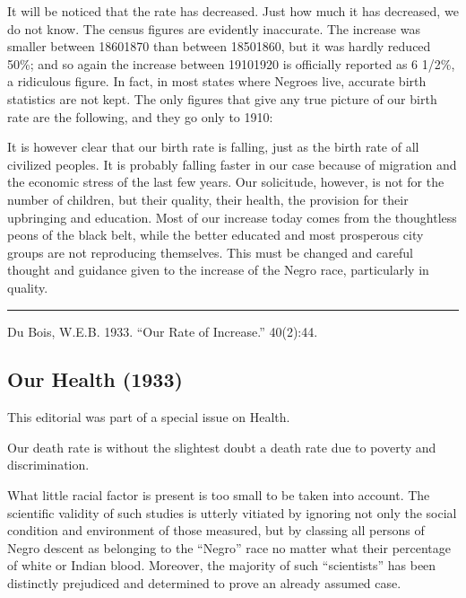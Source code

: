 \documentclass[letterpaper,10pt,english]{jupyterBook}
\begin{document}
\sphinxAtStartPar
It will be noticed that the rate has decreased. Just how much it has decreased, we do not know. The census figures are evidently inaccurate. The increase was smaller between 1860\sphinxhyphen{}1870 than between 1850\sphinxhyphen{}1860, but it was hardly reduced 50\%; and so again the increase between 1910\sphinxhyphen{}1920 is officially reported as 6 1/2\%, a ridiculous figure. In fact, in most states where Negroes live, accurate birth statistics are not kept. The only figures that give any true picture of our birth rate are the following, and they go only to 1910:

\sphinxAtStartPar
{}

\sphinxAtStartPar
It is however clear that our birth rate is falling, just as the birth rate of all civilized peoples. It is probably falling faster in our case because of migration and the economic stress of the last few years. Our solicitude, however, is not for the number of children, but their quality, their health, the provision for their upbringing and education. Most of our increase today comes from the thoughtless peons of the black belt, while the better educated and most prosperous city groups are not reproducing themselves. This must be changed and careful thought and guidance given to the increase of the Negro race, particularly in quality.


\bigskip\hrule\bigskip


\sphinxAtStartPar
{} Du Bois, W.E.B. 1933. “Our Rate of Increase.”  40(2):44.


\subsection{Our Health (1933)}
\label{\detokenize{Volumes/40/02/our_health:our-health-1933}}\label{\detokenize{Volumes/40/02/our_health::doc}}
\begin{sphinxShadowBox}
\sphinxstylesidebartitle{}

\sphinxAtStartPar
This editorial was part of a special issue on Health.
\end{sphinxShadowBox}

\sphinxAtStartPar
Our death rate is without the slightest doubt a death rate due to poverty and discrimination.

\sphinxAtStartPar
What little racial factor is present is too small to be taken into account. The scientific validity of such studies is utterly vitiated by ignoring not only the social condition and environment of those measured, but by classing all persons of Negro descent as belonging to the “Negro” race no matter what their percentage of white or Indian blood. Moreover, the majority of such “scientists” has been distinctly prejudiced and determined to prove an already assumed case.
\end{document}
